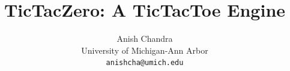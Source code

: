 \documentclass[10pt,twocolumn,letterpaper]{article}
\title{TicTacZero: A TicTacToe Engine}
\author{Anish Chandra\\
University of Michigan-Ann Arbor\\
{\tt\small anishcha@umich.edu}
}
\begin{document}
\maketitle   





{
    \small
    
    
}
\appendix


% 
\end{document}
